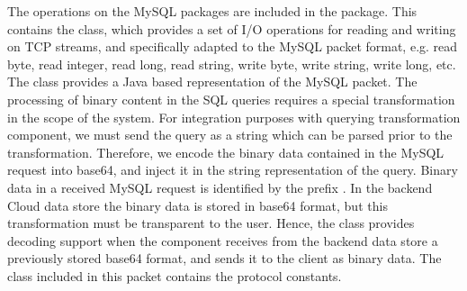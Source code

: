 The operations on the MySQL packages are included in the  package. This contains the  class, which provides a set of I/O operations for reading and writing on \ac{TCP} streams, and specifically adapted to the MySQL packet format, e.g. read byte, read integer, read long, read string, write byte, write string, write long, etc. The  class provides a Java based representation of the MySQL packet. The processing of binary content in the \ac{SQL} queries requires a special transformation in the scope of the system. For integration purposes with querying transformation component, we must send the query as a string which can be parsed prior to the transformation. Therefore, we encode the binary data contained in the MySQL request into base64, and inject it in the string representation of the query. Binary data in a received MySQL request is identified by the prefix . In the backend Cloud data store the binary data is stored in base64 format, but this transformation must be transparent to the user. Hence, the class provides decoding support when the component receives from the backend data store a previously stored base64 format, and sends it to the client as binary data. The  class included in this packet contains the protocol constants. 

